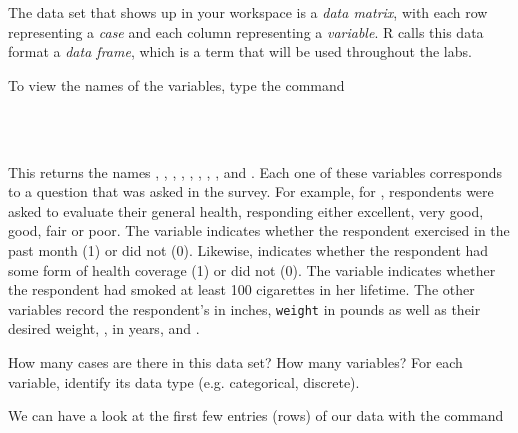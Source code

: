 \documentclass[11pt]{article}
\begin{document}
The data set \texttt{} that shows up in your workspace is a \emph{data matrix}, with each row representing a \emph{case} and each column representing a \emph{variable}.  R calls this data format a \emph{data frame}, which is a term that will be used throughout the labs.

To view the names of the variables, type the command

\ttfamily\noindent
\hlstd{}\hspace*{\fill}\\
\hlstd{}\hlkeyword{(}\hlkeyword{)}\hspace*{\fill}\\
\normalfont

This returns the names \texttt{}, \texttt{}, \texttt{}, \texttt{}, \texttt{}, \texttt{}, \texttt{}, \texttt{}, and \texttt{}. Each one of these variables corresponds to a question that was asked in the survey.  For example, for \texttt{}, respondents were asked to evaluate their general health, responding either excellent, very good, good, fair or poor. The \texttt{} variable indicates whether the respondent exercised in the past month (1) or did not (0). Likewise, \texttt{} indicates whether the respondent had some form of health coverage (1) or did not (0). The \texttt{} variable indicates whether the respondent had smoked at least 100 cigarettes in her lifetime. The other variables record the respondent's \texttt{} in inches, \texttt{weight} in pounds as well as their desired weight, \texttt{}, \texttt{} in years, and \texttt{}.

\begin{exercise}
How many cases are there in this data set?  How many variables?  For each variable, identify its data type (e.g. categorical, discrete).
\end{exercise}

We can have a look at the first few entries (rows) of our data with the command

\ttfamily\noindent
\hlstd{}\hspace*{\fill}\\
\hlstd{}\hlkeyword{(}\hlkeyword{)}\hspace*{\fill}\\
\normalfont
\end{document}
